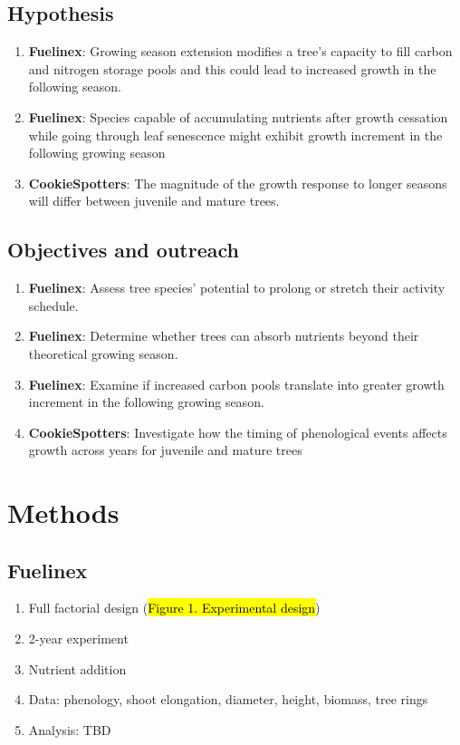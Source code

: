 \documentclass{article}
\begin{document}
\subsection{Hypothesis}
\begin {enumerate}
	\item \textbf{Fuelinex}: Growing season extension modifies a tree’s capacity to fill carbon and nitrogen storage pools and this could lead to increased growth in the following season.
	\item \textbf{Fuelinex}: Species capable of accumulating nutrients after growth cessation while going through leaf senescence might exhibit growth increment in the following growing season
	\item \textbf{CookieSpotters}: The magnitude of the growth response to longer seasons will differ between juvenile and mature trees.
\end {enumerate}

\subsection{Objectives and outreach}
\begin {enumerate}
	\item \textbf{Fuelinex}: Assess tree species’ potential to prolong or stretch their activity schedule.
	\item \textbf{Fuelinex}:  Determine whether trees can absorb nutrients beyond their theoretical growing season.
	\item \textbf{Fuelinex}:  Examine if increased carbon pools translate into greater growth increment in the following growing season. 
	\item \textbf{CookieSpotters}: Investigate how the timing of phenological events affects growth across years for juvenile and mature trees
\end {enumerate}

\section{Methods}

\subsection{Fuelinex}
\begin {enumerate}
	\item Full factorial design (\hl{Figure 1. Experimental design})
	\item 2-year experiment 
	\item Nutrient addition
	\item Data: phenology, shoot elongation, diameter, height, biomass, tree rings
	\item Analysis: TBD
\end {enumerate}
\end{document}
